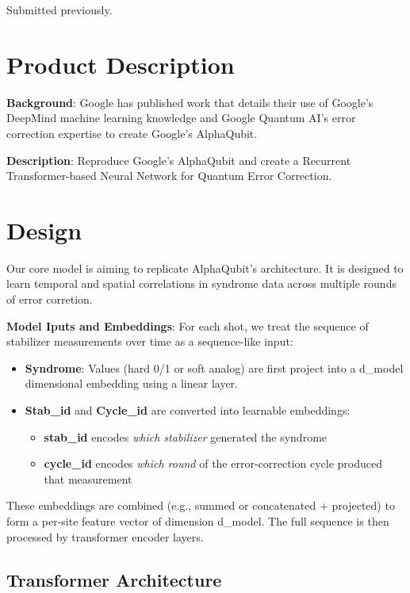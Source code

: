\documentclass[12pt]{article}
\begin{document}
Submitted previously.

\section{Product Description}

\textbf{Background}: Google has published work that details their use of Google's DeepMind machine learning knowledge and Google Quantum AI's error correction expertise to create Google's AlphaQubit.

\textbf{Description}: Reproduce Google's AlphaQubit and create a Recurrent Transformer-based Neural Network for Quantum Error Correction. 

\section{Design}

Our core model is aiming to replicate AlphaQubit's architecture. It is designed to learn temporal and spatial correlations in syndrome data across multiple rounds of error corretion.

\textbf{Model Iputs and Embeddings}: For each shot, we treat the sequence of stabilizer measurements over time as a sequence-like input:

\begin{itemize}
    \item \textbf{Syndrome}: Values (hard 0/1 or soft analog) are first project into a d\_model dimensional embedding using a linear layer.
    \item \textbf{Stab\_id} and \textbf{Cycle\_id} are converted into learnable embeddings:
    \begin{itemize}
        \item \textbf{stab\_id} encodes \textit{which stabilizer} generated the syndrome
        \item \textbf{cycle\_id} encodes \textit{which round} of the error-correction cycle produced that measurement
    \end{itemize}
\end{itemize}

These embeddings are combined (e.g., summed or concatenated + projected) to form a per-site feature vector of dimension d\_model. The full sequence is then processed by transformer encoder layers.

\subsection*{Transformer Architecture}
\end{document}
